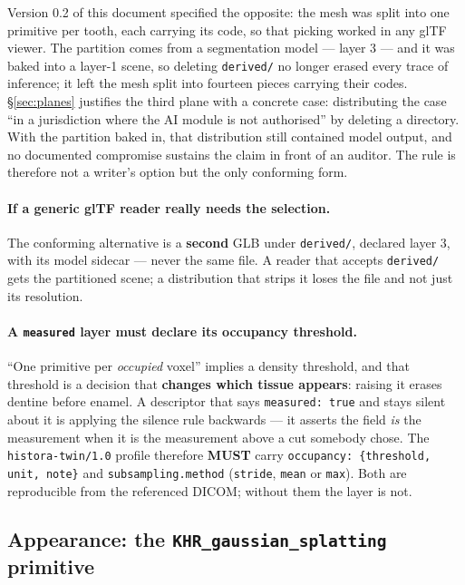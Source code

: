 \documentclass[11pt,a4paper]{article}
\newcommand{\MUST}{\textcolor{uosred}{\textbf{MUST}}}
\newcommand{\code}[1]{\texttt{\small #1}}
\begin{document}
Version 0.2 of this document specified the opposite: the mesh was split into one primitive
per tooth, each carrying its code, so that picking worked in any glTF viewer. The partition
comes from a segmentation model --- layer 3 --- and it was baked into a layer-1 scene, so
deleting \code{derived/} no longer erased every trace of inference; it left the mesh split
into fourteen pieces carrying their codes. \S\ref{sec:planes} justifies the third plane
with a concrete case: distributing the case ``in a jurisdiction where the AI module is not
authorised'' by deleting a directory. With the partition baked in, that distribution still
contained model output, and no documented compromise sustains the claim in front of an
auditor. The rule is therefore not a writer's option but the only conforming form.

\paragraph{If a generic glTF reader really needs the selection.}
The conforming alternative is a \textbf{second} GLB under \code{derived/}, declared layer
3, with its model sidecar --- never the same file. A reader that accepts \code{derived/}
gets the partitioned scene; a distribution that strips it loses the file and not just its
resolution.

\paragraph{A \code{measured} layer must declare its occupancy threshold.}
``One primitive per \emph{occupied} voxel'' implies a density threshold, and that threshold
is a decision that \textbf{changes which tissue appears}: raising it erases dentine before
enamel. A descriptor that says \code{measured: true} and stays silent about it is applying
the silence rule backwards --- it asserts the field \emph{is} the measurement when it is
the measurement above a cut somebody chose. The \code{histora-twin/1.0} profile therefore
\MUST{} carry \code{occupancy: \{threshold, unit, note\}} and
\code{subsampling.method} (\code{stride}, \code{mean} or \code{max}). Both are reproducible
from the referenced DICOM; without them the layer is not.

\subsection{Appearance: the \code{KHR\_gaussian\_splatting} primitive}\label{sec:khr}
\end{document}
